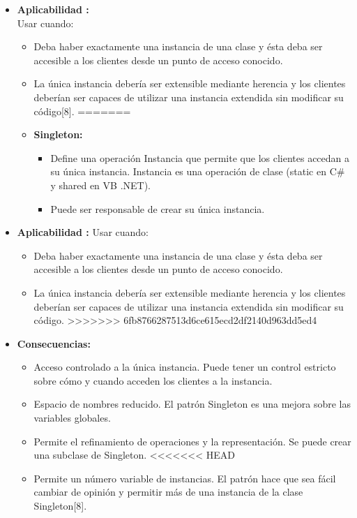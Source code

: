 \documentclass[twoside,twocolumn]{article}
\begin{document}
\begin{itemize}
\begin{itemize}
\begin{itemize}
		\item \textbf{Aplicabilidad :}\\ Usar cuando: 
        \begin{itemize}
            \item Deba haber exactamente una instancia de una clase y ésta deba ser accesible a los clientes desde un punto de acceso conocido.  	
            \item La única instancia debería ser extensible mediante herencia y los clientes deberían ser capaces de utilizar una instancia extendida sin modificar su código[8]. 	
=======
        \item \textbf{Singleton:}	
            \begin{itemize}
                \item Define una operación Instancia que permite que los clientes accedan a su única instancia. Instancia es una operación de clase (static en C# y shared en VB .NET). 	
                \item Puede ser responsable de crear su única instancia.  	
            \end{itemize}
        \end{itemize}    

		\item \textbf{Aplicabilidad :} Usar cuando: 
        \begin{itemize}
            \item Deba haber exactamente una instancia de una clase y ésta deba ser accesible a los clientes desde un punto de acceso conocido.  	
            \item La única instancia debería ser extensible mediante herencia y los clientes deberían ser capaces de utilizar una instancia extendida sin modificar su código. 	
>>>>>>> 6fb8766287513d6ce615ecd2df2140d963dd5ed4
        \end{itemize}

		\item \textbf{Consecuencias:} 
        \begin{itemize}
            \item Acceso controlado a la única instancia. Puede tener un control estricto sobre cómo y cuando acceden los clientes a la instancia.   	
            \item Espacio de nombres reducido. El patrón Singleton es una mejora sobre las variables globales. 	   
            \item Permite el refinamiento de operaciones y la representación. Se puede crear una subclase de Singleton.   
<<<<<<< HEAD
            \item Permite un número variable de instancias. El patrón hace que sea fácil cambiar de opinión y permitir más de una instancia de la clase Singleton[8].  	
        \end{itemize}
	\end{itemize}
	

\end{itemize}
\end{itemize}
\end{document}
